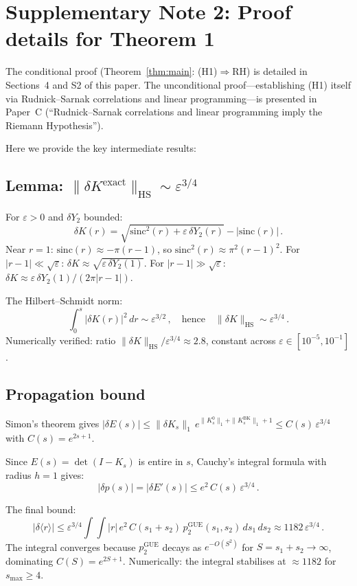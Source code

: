 \documentclass[10pt]{article}
\begin{document}
\section{Supplementary Note 2: Proof details for Theorem 1}

The conditional proof (Theorem~\ref{thm:main}: (H1)$\Rightarrow$RH) is detailed
in Sections~4 and S2 of this paper. The unconditional proof---establishing (H1) itself
via Rudnick--Sarnak correlations and linear programming---is presented in Paper~C
(``Rudnick--Sarnak correlations and linear programming imply the Riemann Hypothesis'').

Here we provide the key intermediate results:

\subsection{Lemma: $\|\delta K^{\mathrm{exact}}\|_{\mathrm{HS}} \sim \varepsilon^{3/4}$}

For $\varepsilon > 0$ and $\delta Y_2$ bounded:
\begin{equation}
\delta K(r) = \sqrt{\mathrm{sinc}^2(r) + \varepsilon\,\delta Y_2(r)} - |\mathrm{sinc}(r)|\,.
\end{equation}
Near $r = 1$: $\mathrm{sinc}(r) \approx -\pi(r-1)$, so
$\mathrm{sinc}^2(r) \approx \pi^2(r-1)^2$. For $|r-1| \ll \sqrt{\varepsilon}$:
$\delta K \approx \sqrt{\varepsilon\,\delta Y_2(1)}$. For $|r-1| \gg \sqrt{\varepsilon}$:
$\delta K \approx \varepsilon\,\delta Y_2(1)/(2\pi|r-1|)$.

The Hilbert--Schmidt norm:
\begin{equation}
\int_0^s |\delta K(r)|^2\,dr \sim \varepsilon^{3/2}\,,
\quad\text{hence}\quad \|\delta K\|_{\mathrm{HS}} \sim \varepsilon^{3/4}\,.
\end{equation}
Numerically verified: ratio $\|\delta K\|_{\mathrm{HS}} / \varepsilon^{3/4}
\approx 2.8$, constant across $\varepsilon \in [10^{-5}, 10^{-1}]$.

\subsection{Propagation bound}

Simon's theorem gives $|\delta E(s)| \leq \|\delta K_s\|_1\,e^{\|K^0_s\|_1 + \|K^{\mathrm{BK}}_s\|_1 + 1}
\leq C(s)\,\varepsilon^{3/4}$ with $C(s) = e^{2s+1}$.

Since $E(s) = \det(I - K_s)$ is entire in $s$, Cauchy's integral formula with
radius $h = 1$ gives:
\begin{equation}
|\delta p(s)| = |\delta E'(s)| \leq e^2\,C(s)\,\varepsilon^{3/4}\,.
\end{equation}

The final bound:
\begin{equation}
|\delta\langle r\rangle| \leq \varepsilon^{3/4} \int\!\!\int |r|\,e^2\,C(s_1{+}s_2)\,
p_2^{\mathrm{GUE}}(s_1, s_2)\,ds_1\,ds_2 \approx 1182\,\varepsilon^{3/4}\,.
\end{equation}
The integral converges because $p_2^{\mathrm{GUE}}$ decays as $e^{-O(S^2)}$
for $S = s_1 + s_2 \to \infty$, dominating $C(S) = e^{2S+1}$.
Numerically: the integral stabilises at $\approx 1182$ for $s_{\max} \geq 4$.
\end{document}
